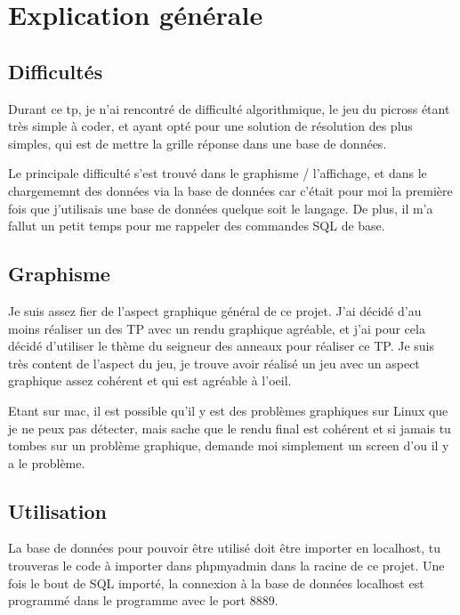 \documentclass[a4paper]{article}
\date{19 Janvier 2017}
\begin{document}
\entete

\section{Explication générale}

\subsection{Difficultés}

Durant ce tp, je n'ai rencontré de difficulté algorithmique, le jeu du picross étant très simple à coder, et ayant opté pour une solution de résolution des plus simples, qui est de mettre la grille réponse dans une base de données.

Le principale difficulté s'est trouvé dans le graphisme / l'affichage, et dans le chargememnt des données via la base de données car c'était pour moi la première fois que j'utilisais une base de données quelque soit le langage. De plus, il m'a fallut un petit temps pour me rappeler des commandes SQL de base.

\subsection{Graphisme}

Je suis assez fier de l'aspect graphique général de ce projet. J'ai décidé d'au moins réaliser un des TP avec un rendu graphique agréable, et j'ai pour cela décidé d'utiliser le thème du seigneur des anneaux pour réaliser ce TP. Je suis très content de l'aspect du jeu, je trouve avoir réalisé un jeu avec un aspect graphique assez cohérent et qui est agréable à l'oeil.

Etant sur mac, il est possible qu'il y est des problèmes graphiques sur Linux que je ne peux pas détecter, mais sache que le rendu final est cohérent et si jamais tu tombes sur un problème graphique, demande moi simplement un screen d'ou il y a le problème.


\subsection{Utilisation}

La base de données pour pouvoir être utilisé doit être importer en localhost, tu trouveras le code à importer dans phpmyadmin dans la racine de ce projet. Une fois le bout de SQL importé, la connexion à la base de données localhost est programmé dans le programme avec le port 8889.
\end{document}
